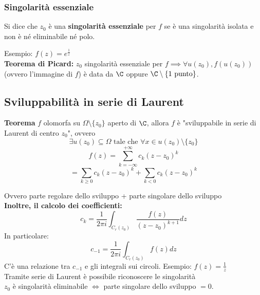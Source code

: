 \subsubsection{Singolarità essenziale}
\begin{tcolorbox}
	Si dice che $z_0$ è una \textbf{singolarità essenziale} per $f$ se è una singolarità isolata e non è né eliminabile né polo.
\end{tcolorbox}
Esempio: $f(z)=e^{\frac{1}{z}}$
\\\textbf{Teorema di Picard: }$z_0$ singolarità essenziale per $f\implies \forall u(z_0),f(u(z_0))$ (ovvero l'immagine di $f$) è data da $\C$ oppure $\C\setminus \{1 \text{ punto}\}$.
\subsection{Sviluppabilità in serie di Laurent}
\begin{tcolorbox}
	\textbf{Teorema} $f$ olomorfa su $\Omega\setminus \{z_0\} $ aperto di $\C$, allora $f$ è "sviluppabile in serie di Laurent di centro $z_0$", ovvero
	\[\exists u(z_0)\subseteq  \Omega \text{ tale che }\forall x\in u(z_0)\setminus \{z_0\} \]
	\[f(z)=\sum_{k=-\infty}^{+\infty} c_k(z-z_0)^k\]
	\[=\sum_{k\ge 0}^{} c_k(z-z_0)^k+\sum_{k<0}^{} c_k(z-z_0)^k\]
\end{tcolorbox}
Ovvero parte regolare dello sviluppo + parte singolare dello sviluppo
\\\textbf{Inoltre, il calcolo dei coefficienti:} 
\[c_k=\frac{1}{2\pi i}\int_{C_r(z_0)}^{} \frac{f(z)}{(z-z_0)^{k+1}}dz\] 
In particolare:
\[c_{-1}=\frac{1}{2\pi i}\int_{C_r(z_0)}^{} f(z)dz\]
C'è una relazione tra $c_{-1}$ e gli integrali sui circoli.
Esempio: $f(z)=\frac{1}{z}$
\\Tramite serie di Laurent è possibile riconoscere le singolarità
\\$z_0$ è singolarità eliminabile $\iff$ parte singolare dello sviluppo $=0$.
